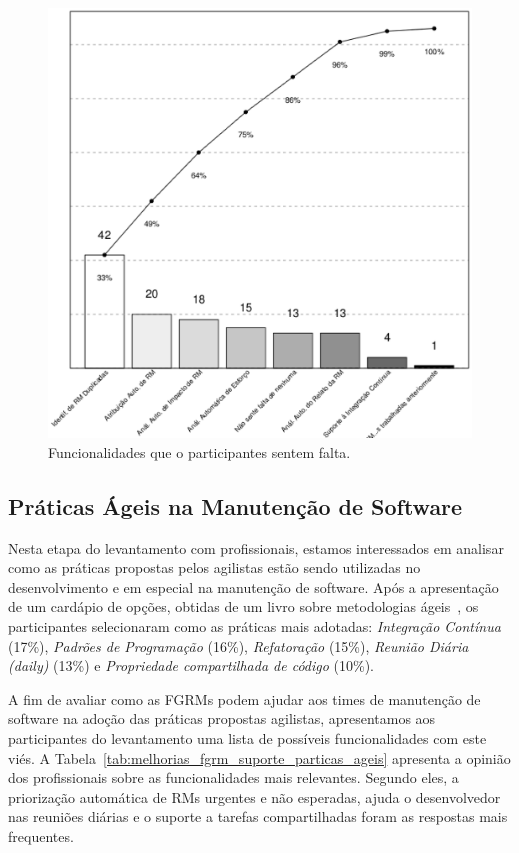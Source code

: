 \begin{figure}[htpb]
	\centering
	\includegraphics[width=0.9\linewidth]{./chapter-pesquisa-com-profissionais/img/grafico_melhorias_fgrm_funcionalidades_faltantes.eps}
	\caption{Funcionalidades que o participantes sentem falta.}
\label{fig:grafico_melhorias_fgrm_funcionalidades_falantes}
\end{figure}

\subsection{Práticas Ágeis na Manutenção de Software}
\label{sub:práticas_ágeis_na_manutenção_de_software}

Nesta etapa do levantamento com profissionais, estamos interessados em analisar
como as práticas propostas pelos agilistas estão sendo utilizadas no
desenvolvimento e em especial na manutenção de software. Após a apresentação de
um cardápio de opções, obtidas de um livro sobre metodologias
ágeis~\cite{meyer2014agile}, os participantes selecionaram como as práticas
mais adotadas: \textit{Integração Contínua} (17\%), \textit{Padrões de
    Programação} (16\%), \textit{Refatoração} (15\%), \textit{Reunião Diária
    (daily)} (13\%) e \textit{Propriedade compartilhada de código} (10\%).

A fim de avaliar como as FGRMs podem ajudar aos times de manutenção de software
na adoção das práticas propostas agilistas, apresentamos aos participantes do
levantamento uma lista de possíveis funcionalidades com este viés. A
Tabela~\ref{tab:melhorias_fgrm_suporte_particas_ageis} apresenta a opinião dos
profissionais sobre as funcionalidades mais relevantes. Segundo eles, a
priorização automática de RMs urgentes e não esperadas, ajuda o desenvolvedor
nas reuniões diárias e o suporte a tarefas compartilhadas foram as respostas
mais frequentes.

